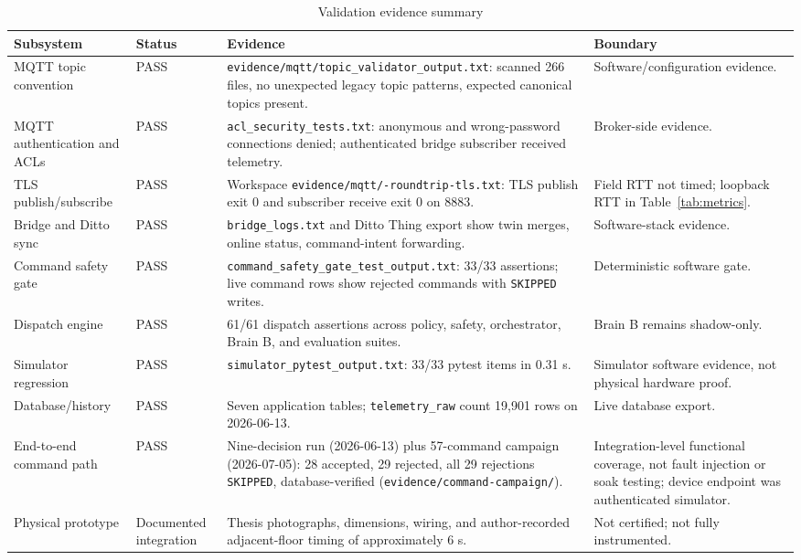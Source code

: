 \documentclass[journal]{IEEEtran}
\newcommand{\toprule}{\hline}
\newcommand{\midrule}{\hline}
\newcommand{\bottomrule}{\hline}
\newcommand{\artifact}[1]{\texttt{#1}}
\begin{document}
\begin{table}[t]
\caption{Validation evidence summary}
\label{tab:validation-summary}
\centering
\footnotesize
\begin{tabularx}{\textwidth}{@{}p{}p{}Yp{0.19\textwidth}@{}}
\toprule
Subsystem & Status & Evidence & Boundary \\
\midrule
MQTT topic convention & PASS & \artifact{evidence/\allowbreak mqtt/\allowbreak topic\_\allowbreak validator\_\allowbreak output.txt}: scanned 266 files, no unexpected legacy topic patterns, expected canonical topics present. & Software/configuration evidence. \\
MQTT authentication and ACLs & PASS & \artifact{acl\_\allowbreak security\_\allowbreak tests.txt}: anonymous and wrong-password connections denied; authenticated bridge subscriber received telemetry. & Broker-side evidence. \\
TLS publish/subscribe & PASS & Workspace \artifact{evidence/\allowbreak mqtt/-roundtrip-tls.txt}: TLS publish exit 0 and subscriber receive exit 0 on 8883. & Field RTT not timed; loopback RTT in \mbox{Table~\ref{tab:metrics}}. \\
Bridge and Ditto sync & PASS & \artifact{bridge\_logs.txt} and Ditto Thing export show twin merges, online status, command-intent forwarding. & Software-stack evidence. \\
Command safety gate & PASS & \artifact{command\_\allowbreak safety\_\allowbreak gate\_\allowbreak test\_\allowbreak output.txt}: 33/33 assertions; live command rows show rejected commands with \artifact{SKIPPED} writes. & Deterministic software gate. \\
Dispatch engine & PASS & 61/61 dispatch assertions across policy, safety, orchestrator, Brain B, and evaluation suites. & Brain B remains shadow-only. \\
Simulator regression & PASS & \artifact{simulator\_\allowbreak pytest\_\allowbreak output.txt}: 33/33 pytest items in 0.31 s. & Simulator software evidence, not physical hardware proof. \\
Database/history & PASS & Seven application tables; \artifact{telemetry\_raw} count 19,901 rows on 2026-06-13. & Live database export. \\
End-to-end command path & PASS & Nine-decision run (2026-06-13) plus 57-command campaign (2026-07-05): 28 accepted, 29 rejected, all 29 rejections \artifact{SKIPPED}, database-verified (\artifact{evidence/\allowbreak command-campaign/}). & Integration-level functional coverage, not fault injection or soak testing; device endpoint was authenticated \mbox{simulator}. \\
Physical prototype & Documented integration & Thesis photographs, dimensions, wiring, and author-recorded adjacent-floor timing of approximately 6 s. & Not certified; not fully instrumented. \\
\bottomrule
\end{tabularx}
\end{table}
\end{document}
